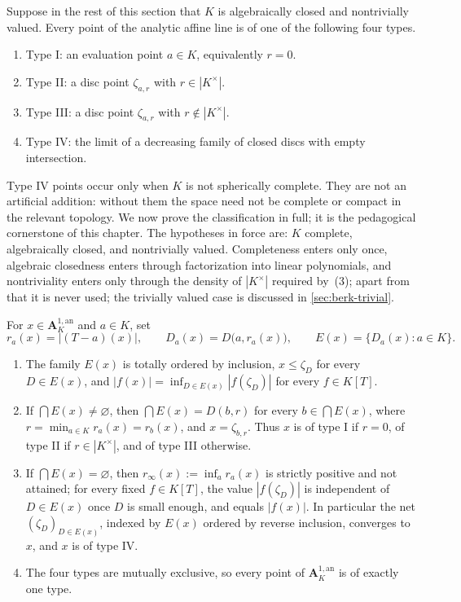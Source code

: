 Suppose in the rest of this section that $K$ is algebraically closed and
nontrivially valued. Every point of the analytic affine line is of one of
the following four types.
\begin{enumerate}
\item Type I: an evaluation point $a\in K$, equivalently $r=0$.
\item Type II: a disc point $\zeta_{a,r}$ with
      $r\in |K^\times|$.
\item Type III: a disc point $\zeta_{a,r}$ with
      $r\notin |K^\times|$.
\item Type IV: the limit of a decreasing family of closed discs with empty
      intersection.
\end{enumerate}
Type IV points occur only when $K$ is not spherically complete. They are
not an artificial addition: without them the space need not be complete or
compact in the relevant topology.  We now prove the classification in
full; it is the pedagogical cornerstone of this chapter.  The hypotheses
in force are: $K$ complete, algebraically closed, and nontrivially
valued.  Completeness enters only once, algebraic closedness enters
through factorization into linear polynomials, and nontriviality enters
only through the density of $|K^\times|$ required by
\,(3); apart from that it is never
used; the trivially valued case is discussed in
\cref{sec:berk-trivial}.

\begin{theorem}
\label{thm:berk-a1-classification}
For $x\in\mathbf A^{1,\mathrm{an}}_K$ and $a\in K$, set
\[
 r_a(x)=|(T-a)(x)|,\qquad
 D_a(x)=D\bigl(a,r_a(x)\bigr),\qquad
 E(x)=\{D_a(x):a\in K\}.
\]
\begin{enumerate}
\item\label{itm:berk-class:nested}
  The family $E(x)$ is totally ordered by inclusion, $x\leq\zeta_D$
  for every $D\in E(x)$, and
  $|f(x)|=\inf_{D\in E(x)}|f(\zeta_D)|$ for every $f\in K[T]$.
\item\label{itm:berk-class:nonempty}
  If $\bigcap E(x)\neq\varnothing$, then
  $\bigcap E(x)=D(b,r)$ for every $b\in\bigcap E(x)$, where
  $r=\min_{a\in K}r_a(x)=r_b(x)$, and $x=\zeta_{b,r}$.  Thus $x$
  is of type I if $r=0$, of type II if $r\in|K^\times|$, and of
  type III otherwise.
\item\label{itm:berk-class:empty}
  If $\bigcap E(x)=\varnothing$, then
  $r_\infty(x):=\inf_ar_a(x)$ is strictly positive and not attained;
  for every fixed $f\in K[T]$, the value $|f(\zeta_D)|$ is
  independent of $D\in E(x)$ once $D$ is small enough, and equals
  $|f(x)|$.  In particular the net $(\zeta_D)_{D\in E(x)}$, indexed
  by $E(x)$ ordered by reverse inclusion, converges to $x$, and
  $x$ is of type IV.
\item\label{itm:berk-class:exclusive}
  The four types are mutually exclusive, so every point of
  $\mathbf A^{1,\mathrm{an}}_K$ is of exactly one type.
\end{enumerate}
\end{theorem}

